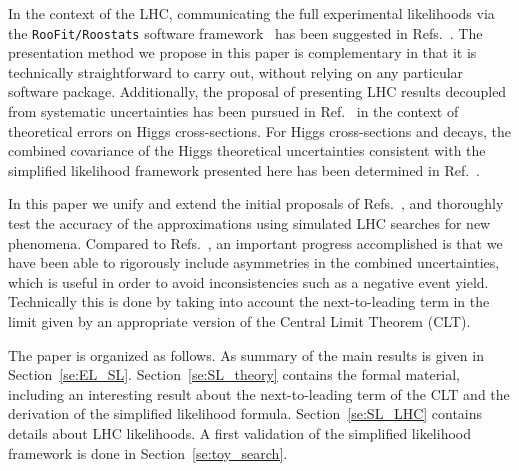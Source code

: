 \documentclass[11pt]{article}
\begin{document}
In the context of the LHC, communicating the full experimental likelihoods via the \texttt{RooFit/Roostats} software framework~\cite{Verkerke:2003ir,Moneta:2010pm} has been suggested in Refs.~\cite{Kraml:2012sg,Boudjema:2013qla}. The presentation method we propose in this paper is complementary in that it is technically straightforward to carry out, without relying on any
particular software package. Additionally, the proposal of presenting LHC results decoupled from systematic uncertainties has been pursued in Ref.~\cite{Cranmer:2013hia} in the context of theoretical errors on Higgs cross-sections. For Higgs cross-sections and decays, the combined covariance of the Higgs theoretical uncertainties consistent with the simplified likelihood framework presented here has been determined in Ref.~\cite{Arbey:2016kqi}.

In this paper we unify and extend the initial proposals of Refs.~\cite{Fichet:2016gvx,SL_note}, and thoroughly test the accuracy of the approximations using simulated LHC searches for new phenomena.
Compared to Refs.~\cite{Fichet:2016gvx,SL_note}, an important progress accomplished is that we have been able to rigorously include asymmetries in the combined uncertainties, which is useful in order to avoid inconsistencies such as a negative event yield. Technically this is done by taking into account the next-to-leading term in the limit given by an appropriate version of the Central Limit Theorem (CLT).

The paper is organized as follows. As summary of the main results is given in Section~\ref{se:EL_SL}. Section~\ref{se:SL_theory} contains the formal material, including
an interesting result about the next-to-leading term of the CLT and the derivation of the simplified likelihood formula. Section~\ref{se:SL_LHC} contains details about LHC likelihoods. A first validation of the simplified likelihood framework is done in Section~\ref{se:toy_search}.

\end{document}
